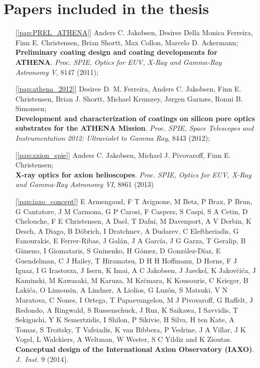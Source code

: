 \chapter{Papers included in the thesis}


\begin{itemize}

\item[{[\ref{pap:PREL_ATHENA}]}]
Anders C. Jakobsen, Desiree Della Monica Ferreira, Finn E. Christensen, Brian Shortt, Max Collon, Marcelo D. Ackermann;\\
\textbf{Preliminary coating design and coating developments for ATHENA}. {\em Proc. SPIE, Optics for EUV, X-Ray and Gamma-Ray Astronomy V}, 8147 (2011);

\item[{[\ref{pap:athena_2012}]}]
Desiree D. M. Ferreira, Anders C. Jakobsen, Finn E. Christensen, Brian J. Shortt, Michael Krumrey, J\o rgen Garn\ae s, Ronni B. Simonsen;\\
\textbf{Development and characterization of coatings on silicon pore optics substrates for the ATHENA Mission}. {\em Proc. SPIE, Space Telescopes and Instrumentation 2012: Ultraviolet to Gamma Ray}, 8443 (2012);

\item[{[\ref{pap:axion_spie}]}]
Anders C. Jakobsen, Michael J. Pivovaroff, Finn E. Christensen;\\
\textbf{X-ray optics for axion helioscopes}. {\em Proc. SPIE, Optics for EUV, X-Ray and Gamma-Ray Astronomy VI}, 8861 (2013)

\item[{[\ref{pap:iaxo_concept}]}]
E Armengaud, F T Avignone, M Betz, P Brax, P Brun, G Cantatore, J M Carmona, G P Carosi, F Caspers, S Caspi, S A Cetin, D Chelouche, F E Christensen, A Dael, T Dafni, M Davenport, A V Derbin, K Desch, A Diago, B D\"{o}brich, I Dratchnev, A Dudarev, C Eleftheriadis, G Fanourakis, E Ferrer-Ribas, J Gal\'{a}n, J A García, J G Garza, T Geralip, B Gimeno, I Giomataris, S Gninenko, H G\'{o}mez, D Gonz\'{a}lez-D\'{i}az, E Guendelman, C J Hailey, T Hiramatsu, D H H Hoffmann, D Horns, F J Iguaz, I G Irastorza, J Isern, K Imai, A C Jakobsen, J Jaeckel, K Jakov\u{c}i\'{c}a, J Kaminski, M Kawasaki, M Karuza, M Kr\u{c}mara, K Kousouris, C Krieger, B Laki\'{c}a, O Limousin, A Lindner, A Liolios, G Luz\'{o}n, S Matsuki, V N Muratova, C Nones, I Ortega, T Papaevangelou, M J Pivovaroff, G Raffelt, J Redondo, A Ringwald, S Russenschuck, J Ruz, K Saikawa, I Savvidis, T Sekiguchi, Y K Semertzidis, I Shilon, P Sikivie, H Silva, H ten Kate, A Tomas, S Troitsky, T Vafeiadis, K van Bibbera, P Vedrine, J A Villar, J K Vogel, L Walckiers, A Weltman, W Wester, S C Yildiz and K Zioutas.\\
\textbf{Conceptual design of the International Axion Observatory (IAXO)}. {\em J.\ Inst.} 9 (2014).
\end{itemize}


%
